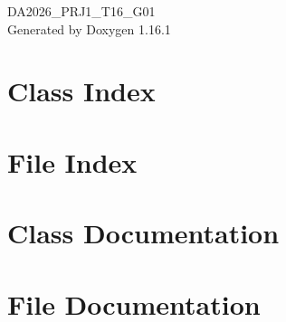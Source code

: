 \documentclass[twoside]{book}
\newcommand{\+}{\discretionary{\mbox{\scriptsize$\hookleftarrow$}}{}{}}
\newcommand{\clearemptydoublepage}{%
    \newpage{\pagestyle{empty}\cleardoublepage}%
  }
\begin{document}
  \raggedbottom
    \hypersetup{pageanchor=false,
                bookmarksnumbered=true,
                pdfencoding=unicode
               }
  \begin{titlepage}
  \vspace*{7cm}
  \begin{center}%
  {\Large DA2026\+\_\+\+PRJ1\+\_\+\+T16\+\_\+\+G01}\\
  \vspace*{1cm}
  {\large Generated by Doxygen 1.16.1}\\
  \end{center}
  \end{titlepage}
  \clearemptydoublepage
  \tableofcontents
  \clearemptydoublepage
  \hypersetup{pageanchor=true}
\chapter{Class Index}

\chapter{File Index}

\chapter{Class Documentation}




\chapter{File Documentation}









  \backmatter
  \newpage
  \clearemptydoublepage
  \printindex
\end{document}
